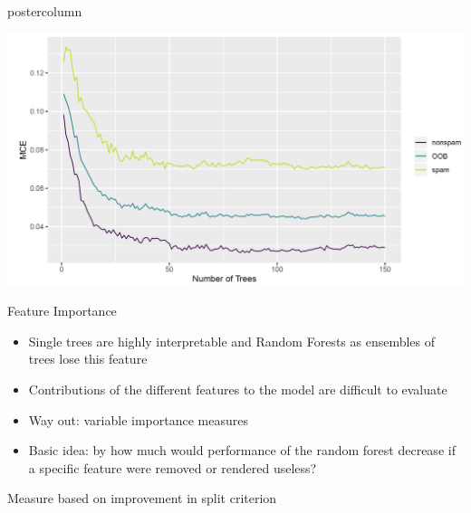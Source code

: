 \documentclass{beamer}
\begin{document}
\begin{frame}[fragile]{}
\begin{columns}
\begin{column}{.31\textwidth}
\begin{beamercolorbox}[center]{postercolumn}
\begin{minipage}{.98\textwidth}
{\begin{myblock}{ }
  \begin{center}
  \includegraphics[width=0.9\columnwidth]{img/img_2.PNG}
  \end{center}
  
  \end{myblock}
  
  \begin{myblock}{Feature Importance}
  
  \begin{itemize}[$\bullet$]     
  \setlength{\itemindent}{+.3in}
  \item Single trees are highly interpretable and Random Forests as ensembles of trees lose this feature
  \item Contributions of the different features to the model are difficult to evaluate
  \item Way out: variable importance measures
  \item Basic idea: by how much would performance of the random forest decrease if a specific feature were removed or rendered useless?
    \end{itemize}
  
  \hspace*{1ex}
  
  \begin{algorithm}[H]
  \small
  \caption{Measure based on improvement in split criterion}
  \begin{algorithmic}[0]
  \EndFor
  \EndFor
  \end{algorithmic}
  \end{algorithm}


\end{myblock}}
\end{minipage}
\end{beamercolorbox}
\end{column}
\end{columns}
\end{frame}
\end{document}
